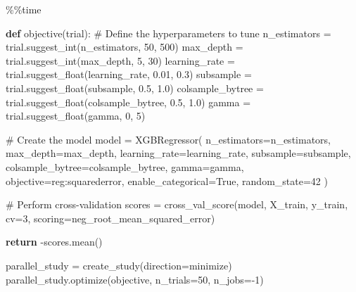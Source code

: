 \documentclass[
  letterpaper,
  DIV=11,
  numbers=noendperiod]{scrreprt}
\newenvironment{Shaded}{\begin{snugshade}}{\end{snugshade}}
\newcommand{\CommentTok}[1]{\textcolor[rgb]{0.37,0.37,0.37}{#1}}
\newcommand{\ControlFlowTok}[1]{\textcolor[rgb]{0.00,0.23,0.31}{\textbf{#1}}}
\newcommand{\DecValTok}[1]{\textcolor[rgb]{0.68,0.00,0.00}{#1}}
\newcommand{\FloatTok}[1]{\textcolor[rgb]{0.68,0.00,0.00}{#1}}
\newcommand{\KeywordTok}[1]{\textcolor[rgb]{0.00,0.23,0.31}{\textbf{#1}}}
\newcommand{\NormalTok}[1]{\textcolor[rgb]{0.00,0.23,0.31}{#1}}
\newcommand{\OperatorTok}[1]{\textcolor[rgb]{0.37,0.37,0.37}{#1}}
\newcommand{\StringTok}[1]{\textcolor[rgb]{0.13,0.47,0.30}{#1}}
\newcommand{\VariableTok}[1]{\textcolor[rgb]{0.07,0.07,0.07}{#1}}
\begin{document}
\begin{Shaded}
\begin{Highlighting}[]
\OperatorTok{\%\%}\NormalTok{time}

\KeywordTok{def}\NormalTok{ objective(trial):}
    \CommentTok{\# Define the hyperparameters to tune}
\NormalTok{    n\_estimators }\OperatorTok{=}\NormalTok{ trial.suggest\_int(}\StringTok{\textquotesingle{}n\_estimators\textquotesingle{}}\NormalTok{, }\DecValTok{50}\NormalTok{, }\DecValTok{500}\NormalTok{)}
\NormalTok{    max\_depth }\OperatorTok{=}\NormalTok{ trial.suggest\_int(}\StringTok{\textquotesingle{}max\_depth\textquotesingle{}}\NormalTok{, }\DecValTok{5}\NormalTok{, }\DecValTok{30}\NormalTok{)}
\NormalTok{    learning\_rate }\OperatorTok{=}\NormalTok{ trial.suggest\_float(}\StringTok{\textquotesingle{}learning\_rate\textquotesingle{}}\NormalTok{, }\FloatTok{0.01}\NormalTok{, }\FloatTok{0.3}\NormalTok{)}
\NormalTok{    subsample }\OperatorTok{=}\NormalTok{ trial.suggest\_float(}\StringTok{\textquotesingle{}subsample\textquotesingle{}}\NormalTok{, }\FloatTok{0.5}\NormalTok{, }\FloatTok{1.0}\NormalTok{)}
\NormalTok{    colsample\_bytree }\OperatorTok{=}\NormalTok{ trial.suggest\_float(}\StringTok{\textquotesingle{}colsample\_bytree\textquotesingle{}}\NormalTok{, }\FloatTok{0.5}\NormalTok{, }\FloatTok{1.0}\NormalTok{)}
\NormalTok{    gamma }\OperatorTok{=}\NormalTok{ trial.suggest\_float(}\StringTok{\textquotesingle{}gamma\textquotesingle{}}\NormalTok{, }\DecValTok{0}\NormalTok{, }\DecValTok{5}\NormalTok{)}

    \CommentTok{\# Create the model}
\NormalTok{    model }\OperatorTok{=}\NormalTok{ XGBRegressor(}
\NormalTok{        n\_estimators}\OperatorTok{=}\NormalTok{n\_estimators,}
\NormalTok{        max\_depth}\OperatorTok{=}\NormalTok{max\_depth,}
\NormalTok{        learning\_rate}\OperatorTok{=}\NormalTok{learning\_rate,}
\NormalTok{        subsample}\OperatorTok{=}\NormalTok{subsample,}
\NormalTok{        colsample\_bytree}\OperatorTok{=}\NormalTok{colsample\_bytree,}
\NormalTok{        gamma}\OperatorTok{=}\NormalTok{gamma,}
\NormalTok{        objective}\OperatorTok{=}\StringTok{\textquotesingle{}reg:squarederror\textquotesingle{}}\NormalTok{,}
\NormalTok{        enable\_categorical}\OperatorTok{=}\VariableTok{True}\NormalTok{,}
\NormalTok{        random\_state}\OperatorTok{=}\DecValTok{42}
\NormalTok{    )}

    \CommentTok{\# Perform cross{-}validation}
\NormalTok{    scores }\OperatorTok{=}\NormalTok{ cross\_val\_score(model, X\_train, y\_train, cv}\OperatorTok{=}\DecValTok{3}\NormalTok{, scoring}\OperatorTok{=}\StringTok{\textquotesingle{}neg\_root\_mean\_squared\_error\textquotesingle{}}\NormalTok{)}
    
    \ControlFlowTok{return} \OperatorTok{{-}}\NormalTok{scores.mean()}

\NormalTok{parallel\_study }\OperatorTok{=}\NormalTok{ create\_study(direction}\OperatorTok{=}\StringTok{\textquotesingle{}minimize\textquotesingle{}}\NormalTok{)}
\NormalTok{parallel\_study.optimize(objective, n\_trials}\OperatorTok{=}\DecValTok{50}\NormalTok{, n\_jobs}\OperatorTok{={-}}\DecValTok{1}\NormalTok{)}
\end{Highlighting}
\end{Shaded}
\end{document}
